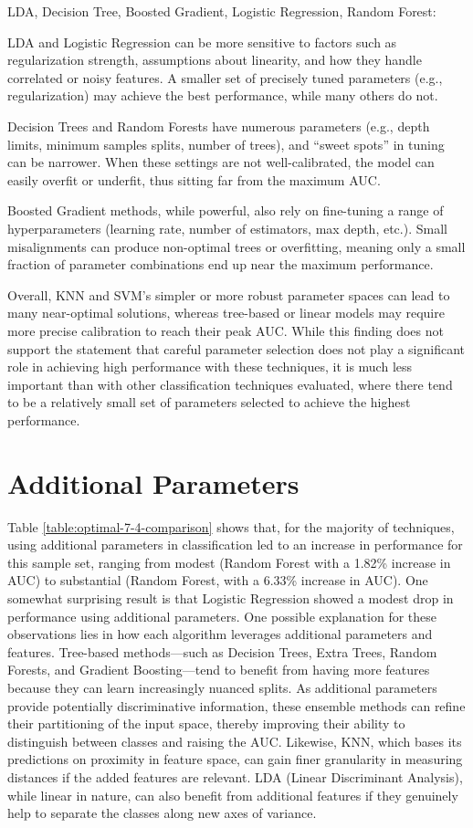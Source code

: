 \documentclass[letterpaper, notitlepage]{report}
\begin{document}
LDA, Decision Tree, Boosted Gradient, Logistic Regression, Random Forest:

LDA and Logistic Regression can be more sensitive to factors such as regularization strength, assumptions about linearity, and how they handle correlated or noisy features. A smaller set of precisely tuned parameters (e.g., regularization) may achieve the best performance, while many others do not.

Decision Trees and Random Forests have numerous parameters (e.g., depth limits, minimum samples splits, number of trees), and “sweet spots” in tuning can be narrower. When these settings are not well-calibrated, the model can easily overfit or underfit, thus sitting far from the maximum AUC.

Boosted Gradient methods, while powerful, also rely on fine-tuning a range of hyperparameters (learning rate, number of estimators, max depth, etc.). Small misalignments can produce non-optimal trees or overfitting, meaning only a small fraction of parameter combinations end up near the maximum performance.

Overall, KNN and SVM’s simpler or more robust parameter spaces can lead to many near-optimal solutions, whereas tree-based or linear models may require more precise calibration to reach their peak AUC. While this finding does not support the statement that careful parameter selection does not play a significant role in achieving high performance with these techniques, it is much less important than with other classification techniques evaluated, where there tend to be a relatively small set of parameters selected to achieve the highest performance.

\section{Additional Parameters}
Table \ref{table:optimal-7-4-comparison} shows that, for the majority of techniques, using additional parameters in classification led to an increase in performance for this sample set, ranging from modest (Random Forest with a 1.82\% increase in AUC) to substantial (Random Forest, with a 6.33\% increase in AUC). One somewhat surprising result is that Logistic Regression showed a modest drop in performance using additional parameters. One possible explanation for these observations lies in how each algorithm leverages additional parameters and features. Tree-based methods—such as Decision Trees, Extra Trees, Random Forests, and Gradient Boosting—tend to benefit from having more features because they can learn increasingly nuanced splits. As additional parameters provide potentially discriminative information, these ensemble methods can refine their partitioning of the input space, thereby improving their ability to distinguish between classes and raising the AUC. Likewise, KNN, which bases its predictions on proximity in feature space, can gain finer granularity in measuring distances if the added features are relevant. LDA (Linear Discriminant Analysis), while linear in nature, can also benefit from additional features if they genuinely help to separate the classes along new axes of variance.
\end{document}

